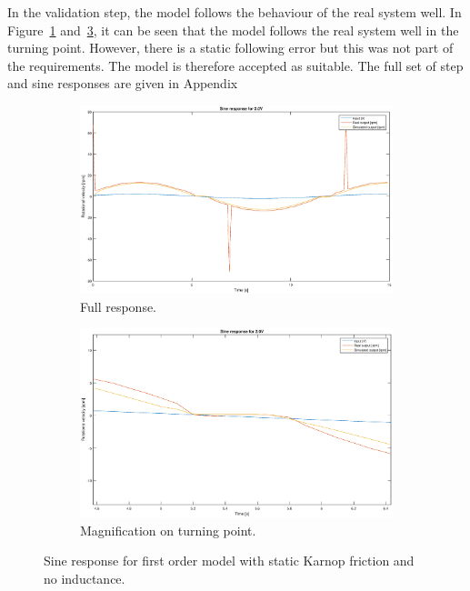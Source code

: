 In the validation step, the model follows the behaviour of the real system well.
In Figure~\ref{fig:1storder_f_sine2} and~\ref{fig:1storder_f_sine2z}, it can be
seen that the model follows the real system well in the turning point. However,
there is a static following error but this was not part of the requirements. The
model is therefore accepted as suitable. The full set of step and sine responses
are given in Appendix %
\begin{figure}[H]
    \centering
    \begin{subfigure}[H]{0.48\textwidth}
    \includegraphics[width=\textwidth]{./img/testrig_2Vsine_no_i_fric.eps}
    \caption{Full response.}\label{fig:1storder_f_sine2}
    \end{subfigure}
    \begin{subfigure}[H]{0.48\textwidth}
    \includegraphics[width=\textwidth]{./img/testrig_2Vsine_no_i_fric_zoom.eps}
    \caption{Magnification on turning point.}\label{fig:1storder_f_sine2z}
    \end{subfigure}
    \caption{Sine response for first order model with static Karnop friction and 
    no inductance.}
\end{figure}

